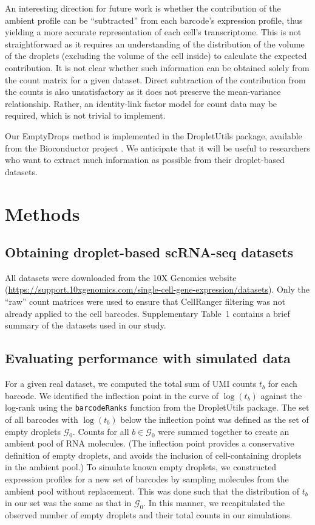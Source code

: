 \documentclass[10pt,letterpaper]{article}
\newcommand{\code}[1]{\texttt{#1}}
\newcommand{\supptabdataset}{1}
\begin{document}
An interesting direction for future work is whether the contribution of the ambient profile can be ``subtracted'' from each barcode's expression profile, thus yielding a more accurate representation of each cell's transcriptome.
This is not straightforward as it requires an understanding of the distribution of the volume of the droplets (excluding the volume of the cell inside) to calculate the expected contribution.
It is not clear whether such information can be obtained solely from the count matrix for a given dataset.
Direct subtraction of the contribution from the counts is also unsatisfactory as it does not preserve the mean-variance relationship.
Rather, an identity-link factor model for count data may be required, which is not trivial to implement. 

Our EmptyDrops method is implemented in the \textsf{DropletUtils} package, available from the Bioconductor project \cite{huber2015orchestrating}.
We anticipate that it will be useful to researchers who want to extract much information as possible from their droplet-based datasets.

\section*{Methods}

\subsection*{Obtaining droplet-based scRNA-seq datasets}
All datasets were downloaded from the 10X Genomics website (\url{https://support.10xgenomics.com/single-cell-gene-expression/datasets}).
Only the ``raw'' count matrices were used to ensure that CellRanger filtering was not already applied to the cell barcodes.
Supplementary Table~\supptabdataset{} contains a brief summary of the datasets used in our study.

\subsection*{Evaluating performance with simulated data}
For a given real dataset, we computed the total sum of UMI counts $t_b$ for each barcode.
We identified the inflection point in the curve of $\log(t_b)$ against the log-rank using the \code{barcodeRanks} function from the \textsf{DropletUtils} package.
The set of all barcodes with $\log(t_b)$ below the inflection point was defined as the set of empty droplets $\mathcal{G}_0$.
Counts for all $b \in \mathcal{G}_0$ were summed together to create an ambient pool of RNA molecules.
(The inflection point provides a conservative definition of empty droplets, and avoids the inclusion of cell-containing droplets in the ambient pool.)
To simulate known empty droplets, we constructed expression profiles for a new set of barcodes by sampling molecules from the ambient pool without replacement.
This was done such that the distribution of $t_b$ in our set was the same as that in $\mathcal{G}_0$. 
In this manner, we recapitulated the observed number of empty droplets and their total counts in our simulations.
\end{document}
